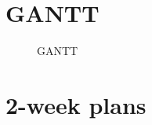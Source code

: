 \section{GANTT}
\label{sec:GANTT}
\begin{figure}[H]
	\centering
	\caption{GANTT}
	\label{fig:GANTT}
\end{figure}



\section{2-week plans}
\label{sec:2-week plans}

